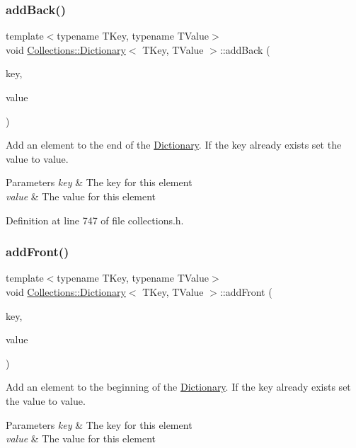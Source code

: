 \subsubsection{\texorpdfstring{add\+Back()}{addBack()}}
{\footnotesize\ttfamily template$<$typename T\+Key, typename T\+Value$>$ \\
void \hyperlink{class_collections_1_1_dictionary}{Collections\+::\+Dictionary}$<$ T\+Key, T\+Value $>$\+::add\+Back (\begin{DoxyParamCaption}\item[{T\+Key}]{key,  }\item[{T\+Value}]{value }\end{DoxyParamCaption})}

Add an element to the end of the \hyperlink{class_collections_1_1_dictionary}{Dictionary}. If the key already exists set the value to value. 
\begin{DoxyParams}{Parameters}
{\em key} & The key for this element \\
\hline
{\em value} & The value for this element \\
\hline
\end{DoxyParams}


Definition at line 747 of file collections.\+h.

\hypertarget{class_collections_1_1_dictionary_a579608263d8579d4664d8cf393e54c00}{}\label{class_collections_1_1_dictionary_a579608263d8579d4664d8cf393e54c00} 
\subsubsection{\texorpdfstring{add\+Front()}{addFront()}}
{\footnotesize\ttfamily template$<$typename T\+Key, typename T\+Value$>$ \\
void \hyperlink{class_collections_1_1_dictionary}{Collections\+::\+Dictionary}$<$ T\+Key, T\+Value $>$\+::add\+Front (\begin{DoxyParamCaption}\item[{T\+Key}]{key,  }\item[{T\+Value}]{value }\end{DoxyParamCaption})}

Add an element to the beginning of the \hyperlink{class_collections_1_1_dictionary}{Dictionary}. If the key already exists set the value to value. 
\begin{DoxyParams}{Parameters}
{\em key} & The key for this element \\
\hline
{\em value} & The value for this element \\
\hline
\end{DoxyParams}



